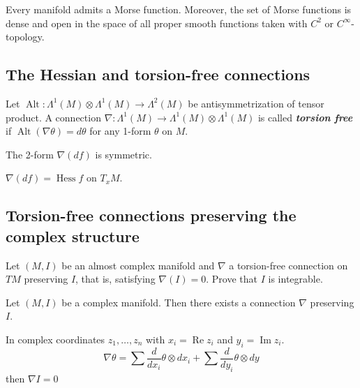 \begin{claim}\leavevmode
	Every manifold admits a Morse function. Moreover, the set of Morse functions is dense and open in the space of all proper smooth functions taken with $C^2$ or $C^\infty$-topology.
\end{claim}

\subsection{The Hessian and torsion-free connections}

\begin{defn}\leavevmode
	Let $\operatorname{Alt}:\Lambda^{1}(M)\otimes \Lambda^{1}(M)\to \Lambda^{2}(M)$ be antisymmetrization of tensor product. A connection $\nabla :\Lambda^{1}(M)\to \Lambda^{1}(M)\otimes \Lambda^{1}(M)$ is called \textit{\textbf{torsion free}} if $\operatorname{Alt}(\nabla \theta)=d\theta$ for any 1-form $\theta$ on $M$.
\end{defn}

\begin{claim}\leavevmode
	The 2-form $\nabla(df)$ is symmetric.
\end{claim}

\begin{claim}\leavevmode
	$\nabla(df)=\operatorname{Hes s}f$ on $T_xM$.
\end{claim}

\subsection{Torsion-free connections preserving the complex structure}

\begin{exercise}\leavevmode
	Let $(M,I)$ be an almost complex manifold and $\nabla$ a torsion-free connection on $TM$ preserving $I$, that is, satisfying $\nabla(I)=0$. Prove that $I$ is integrable.
\end{exercise}

\begin{exercise}\leavevmode
	Let $(M, I)$ be a complex manifold. Then there exists a connection $\nabla$ preserving $I$.
\end{exercise}

\begin{remark}\leavevmode
	In complex coordinates $z_1,\ldots,z_n$ with $x_i=\operatorname{Re}z_i$ and $y_i=\operatorname{Im}z_i$.
	\[\nabla \theta=\sum \frac{d}{dx_i}\theta \otimes dx_i+\sum \frac{d}{dy_i}\theta \otimes dy\]
	then $\nabla I=0$
\end{remark}

